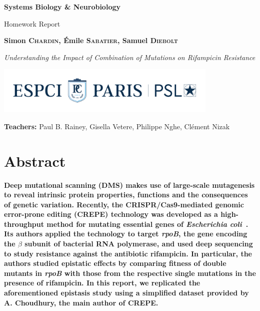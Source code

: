 \documentclass[12pt]{article}
\begin{document}
  \begin{titlepage}
    \begin{center}
      \vspace*{1cm}
 
      \Huge
      \textbf{Systems Biology \& Neurobiology}
 
      \vspace{0.5cm}
      \LARGE
      Homework Report
 
      \vspace{1.5cm}
 
      \Large\textbf{Simon \textsc{Chardin}, Émile \textsc{Sabatier}, Samuel
      \textsc{Diebolt}}

      \vfill 

      \textit{Understanding the Impact of Combination of Mutations on
      Rifampicin Resistance}
 
      \vfill 

      \includegraphics[width=0.8\textwidth]{espci_logo}
 
      \Large
      \textbf{Teachers:} Paul B. Rainey, Gisella Vetere, Philippe Nghe, Clément
      Nizak
    \end{center}
    \thispagestyle{empty}
  \end{titlepage}


  \section{Abstract}

  \textbf{Deep mutational scanning (DMS) makes use of large-scale mutagenesis
  to reveal intrinsic protein properties, functions and the consequences of
  genetic variation. Recently, the CRISPR/Cas9-mediated genomic error-prone
  editing (CREPE) technology was developed as a high-throughput method for
  mutating essential genes of \textit{Escherichia coli}~\cite{choudhury2020}.
  Its authors applied the technology to target \textit{rpoB}, the gene encoding
  the $\beta$ subunit of bacterial RNA polymerase, and used deep sequencing to
  study resistance against the antibiotic rifampicin. In particular, the
  authors studied epistatic effects by comparing fitness of double mutants in
  \textit{rpoB} with those from the respective single mutations in the presence
  of rifampicin. In this report, we replicated the aforementioned epistasis
  study using a simplified dataset provided by A. Choudhury, the main author
  of CREPE.}
\end{document}
